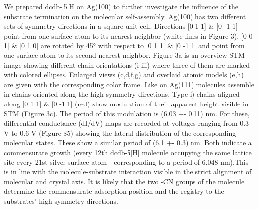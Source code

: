 We prepared dcdb-[5]H on Ag(100) to further investigate the influence of the substrate termination on the molecular self-assembly. Ag(100) has two different sets of symmetry directions in a square unit cell. Directions [0 1 1] \& [0 -1 1] point from one surface atom to its nearest neighbor (white lines in Figure 3). [0 0 1] \& [0 1 0] are rotated by 45° with respect to [0 1 1] \& [0 -1 1] and point from one surface atom to its second nearest neighbor. Figure 3a is an overview STM image showing different chain orientations (i-iii) where three of them are marked with colored ellipses. Enlarged views (c,d,f,g) and overlaid atomic models (e,h) are given with the corresponding color frame. Like on Ag(111) molecules assemble in chains oriented along the high symmetry directions. Type i) chains aligned along [0 1 1] \& [0 -1 1] (red) show modulation of their apparent height visible in STM (Figure 3c). The period of this modulation is (6.03 +- 0.11) nm. For these, differential conductance (dI/dV) maps are recorded at voltages ranging from 0.3 V to 0.6 V (Figure S5) showing the lateral distribution of the corresponding molecular states. These show a similar period of (6.1 +- 0.3) nm. Both indicate a commensurate growth (every 12th dcdb-5[H] molecule occupying the same lattice site every 21st silver surface atom - corresponding to a period of 6.048 nm).This is in line with the molecule-substrate interaction visible in the strict alignment of molecular and crystal axis. It is likely that the two -CN groups of the molecule determine the commensurate adsorption position and the registry to the substrates’ high symmetry directions. 

